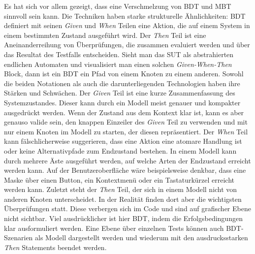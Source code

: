 Es hat sich vor allem gezeigt, dass eine Verschmelzung von \Gls{BDT} und \Gls{MBT} sinnvoll sein kann. Die Techniken haben starke strukturelle Ähnlichkeiten: \Gls{BDT} definiert mit seinen \textit{Given} und \textit{When} Teilen eine Aktion, die auf einem System in einem bestimmten Zustand ausgeführt wird. Der \textit{Then} Teil ist eine Aneinanderreihung von Überprüfungen, die zusammen evaluiert werden und über das Resultat des Testfalls entscheiden. Sieht man das \Gls{SUT} als abstrahierten endlichen Automaten und visualisiert man einen solchen \textit{Given-When-Then} Block, dann ist ein \Gls{BDT} ein Pfad von einem Knoten zu einem anderen. Sowohl die beiden Notationen als auch die darunterliegenden Technologien haben ihre Stärken und Schwächen. Der \textit{Given} Teil ist eine kurze Zusammenfassung des Systemzustandes. Dieser kann durch ein Modell meist genauer und kompakter ausgedrückt werden. Wenn der Zustand aus dem Kontext klar ist, kann es aber genauso valide sein, den knappen Einzeiler des \textit{Given} Teil zu verwenden und mit nur einem Knoten im Modell zu starten, der diesen repräsentiert. Der \textit{When} Teil kann fälschlicherweise suggerieren, dass eine Aktion eine atomare Handlung ist oder keine Alternativpfade zum Endzustand bestehen. In einem Modell kann durch mehrere Äste ausgeführt werden, auf welche Arten der Endzustand erreicht werden kann. Auf der Benutzeroberfläche wäre beispielsweise denkbar, dass eine Maske über einen Button, ein Kontextmenü oder ein Tastaturkürzel erreicht werden kann. Zuletzt steht der \textit{Then} Teil, der sich in einem Modell nicht von anderen Knoten unterscheidet. In der Realität finden dort aber die wichtigsten Überprüfungen statt. Diese verbergen sich im Code und sind auf grafischer Ebene nicht sichtbar. Viel ausdrücklicher ist hier \Gls{BDT}, indem die Erfolgsbedingungen klar ausformuliert werden. Eine Ebene über einzelnen Tests können auch \Gls{BDT}-Szenarien als Modell dargestellt werden und wiederum mit den ausdrucksstarken \textit{Then} Statements beendet werden.\\


